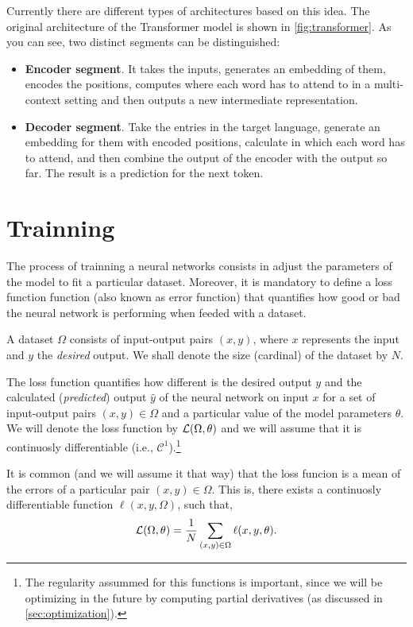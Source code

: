 Currently there are different types of architectures based on this idea. The
original architecture of the Transformer model is shown in
\vref{fig:transformer}. As you can see, two distinct segments can be
distinguished:
\begin{itemize}
  \item \textbf{Encoder segment}. It takes the inputs, generates an embedding
  of them, encodes the positions, computes where each word has to attend to in
  a multi-context setting and then outputs a new intermediate representation.
  \item \textbf{Decoder segment}. Take the entries in the target language,
  generate an embedding for them with encoded positions, calculate in which
  each word has to attend, and then combine the output of the encoder with the
  output so far. The result is a prediction for the next token.
\end{itemize}



\section{Trainning}

The process of trainning a neural networks consists in adjust the parameters of
the model to fit a particular dataset. Moreover, it is mandatory to define a
loss function function (also known as error function) that quantifies how good
or bad the neural network is performing when feeded with a dataset.

A dataset \(\Omega\) consists of input-output pairs \((x, y)\), where \(x\)
represents the input and \(y\) the \emph{desired} output. We shall denote the
size (cardinal) of the dataset by \(N\).

The loss function quantifies how different is the desired output \(y\) and the
calculated (\emph{predicted}) output \(\hat{y}\) of the neural network on input
\(x\) for a set of input-output pairs \((x , y) \in \Omega\) and a particular
value of the model parameters \(\theta\). We will denote the loss function by
\(\mathcal{L} (\Omega, \theta)\) and we will assume that it is continuosly
differentiable (i.e., \(\mathcal{C}^1\)).\footnote{The regularity assummed for
  this functions is important, since we will be optimizing in the future by
  computing partial derivatives (as discussed in \vref{sec:optimization}).}

It is common (and we will assume it that way) that the loss funcion is a mean
of the errors of a particular pair \((x, y) \in \Omega\). This is, there exists
a continuosly differentiable function \(\ell (x, y, \Omega)\), such that,
\begin{equation} \label{eq:loss}
  \mathcal{L}(\Omega, \theta) =
  \frac{1}{N} \sum_{(x, y) \in \Omega} \ell (x, y, \theta).
\end{equation}

